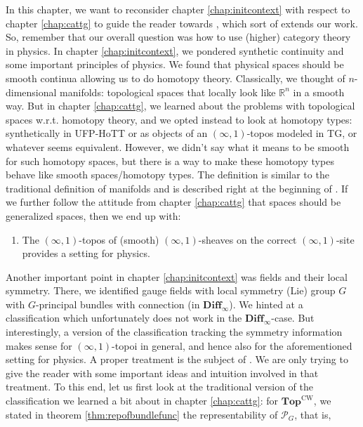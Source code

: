 In this chapter, we want to reconsider chapter \ref{chap:initcontext} with respect to chapter \ref{chap:cattg} to guide the reader towards \cite{a565d200}, which sort of extends our work.
So, remember that our overall question was how to use (higher) category theory in physics.
In chapter \ref{chap:initcontext}, we pondered synthetic continuity and some important principles of physics.
We found that physical spaces should be smooth continua allowing us to do homotopy theory.
Classically, we thought of $n$-dimensional manifolds: topological spaces that locally look like $\mathbb{R}^{n}$ in a smooth way.
But in chapter \ref{chap:cattg}, we learned about the problems with topological spaces w.r.t. homotopy theory, and we opted instead to look at homotopy types: synthetically in UFP-HoTT or as objects of an $(\infty,1)$-topos modeled in TG, or whatever seems equivalent.
However, we didn't say what it means to be {\glqq}smooth{\grqq} for such homotopy spaces, but there is a way to make these homotopy types behave like smooth spaces/homotopy types.
The definition is similar to the traditional definition of manifolds and is described right at the beginning of \cite{a565d200}.
If we further follow the attitude from chapter \ref{chap:cattg} that spaces should be generalized spaces, then we end up with:
\begin{enumerate}
\item[$\bullet$]
The $(\infty,1)$-topos of (smooth) $(\infty,1)$-sheaves on the {\glqq}correct{\grqq} $(\infty,1)$-site provides a setting for physics.
\end{enumerate}
Another important point in chapter \ref{chap:initcontext} was fields and their local symmetry.
There, we identified {\glqq}gauge fields with local symmetry (Lie) group $G${\grqq} with {\glqq}$G$-principal bundles with connection (in $\mathbf{Diff}_{\infty}$){\grqq}.
We hinted at a classification which unfortunately does not work in the $\mathbf{Diff}_{\infty}$-case.
But interestingly, a version of the classification tracking the symmetry information makes sense for $(\infty,1)$-topoi in general, and hence also for the aforementioned setting for physics.
A proper treatment is the subject of \cite{a565d200}.
We are only trying to give the reader with some important ideas and intuition involved in that treatment.
To this end, let us first look at the traditional version of the classification we learned a bit about in chapter \ref{chap:cattg}: for $\mathbf{Top}^{\textrm{CW}}$, we stated in theorem \ref{thm:repofbundlefunc} the representability of $\mathcal{P}_{G}$, that is,
